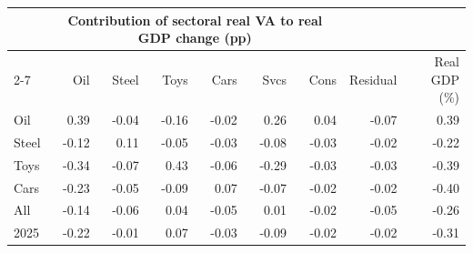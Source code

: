 \begin{tabular}{lrrrrrrrr}
\toprule
 & \multicolumn{6}{c}{Contribution of sectoral real VA to real GDP change (pp)} & & \\
\cmidrule(lr){2-7}
 & Oil & Steel & Toys & Cars & Svcs & Cons & Residual & Real GDP (\%) \\
\midrule
Oil & 0.39 & -0.04 & -0.16 & -0.02 & 0.26 & 0.04 & -0.07 & 0.39 \\
Steel & -0.12 & 0.11 & -0.05 & -0.03 & -0.08 & -0.03 & -0.02 & -0.22 \\
Toys & -0.34 & -0.07 & 0.43 & -0.06 & -0.29 & -0.03 & -0.03 & -0.39 \\
Cars & -0.23 & -0.05 & -0.09 & 0.07 & -0.07 & -0.02 & -0.02 & -0.40 \\
All & -0.14 & -0.06 & 0.04 & -0.05 & 0.01 & -0.02 & -0.05 & -0.26 \\
2025 & -0.22 & -0.01 & 0.07 & -0.03 & -0.09 & -0.02 & -0.02 & -0.31 \\
\bottomrule
\end{tabular}
